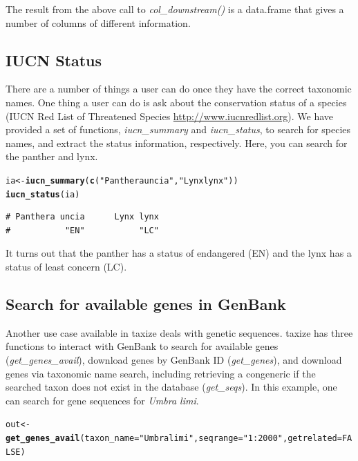 \documentclass[10pt,a4paper,twocolumn]{article}\usepackage[]{graphicx}\usepackage[]{color}
\makeatletter
\newcommand{\hlnum}[1]{\textcolor[rgb]{0.686,0.059,0.569}{#1}}%
\newcommand{\hlstr}[1]{\textcolor[rgb]{0.192,0.494,0.8}{#1}}%
\newcommand{\hlstd}[1]{\textcolor[rgb]{0.345,0.345,0.345}{#1}}%
\newcommand{\hlkwb}[1]{\textcolor[rgb]{0.69,0.353,0.396}{#1}}%
\newcommand{\hlkwc}[1]{\textcolor[rgb]{0.333,0.667,0.333}{#1}}%
\newcommand{\hlkwd}[1]{\textcolor[rgb]{0.737,0.353,0.396}{\textbf{#1}}}%
\newenvironment{kframe}{%
 \def\at@end@of@kframe{}%
 \ifinner\ifhmode%
  \def\at@end@of@kframe{\end{minipage}}%
  \begin{minipage}{\columnwidth}%
 \fi\fi%
 \def\FrameCommand##1{\hskip\@totalleftmargin \hskip-\fboxsep
 \colorbox{shadecolor}{##1}\hskip-\fboxsep
     \hskip-\linewidth \hskip-\@totalleftmargin \hskip\columnwidth}%
 \MakeFramed {\advance\hsize-\width
   \@totalleftmargin\z@ \linewidth\hsize
   \@setminipage}}%
 {\par\unskip\endMakeFramed%
 \at@end@of@kframe}
\newenvironment{knitrout}{}{} %
\makeatother
\begin{document}
The result from the above call to \emph{col\_downstream()} is a data.frame that gives a number of columns of different information.

\subsection*{IUCN Status}
There are a number of things a user can do once they have the correct taxonomic names. One thing a user can do is ask about the conservation status of a species (IUCN Red List of Threatened Species \url{http://www.iucnredlist.org}). We have provided a set of functions, \emph{iucn\_summary} and \emph{iucn\_status}, to search for species names, and extract the status information, respectively. Here, you can search for the panther and lynx.

\begin{knitrout}\scriptsize
{}\color{fgcolor}\begin{kframe}
\begin{alltt}
\hlstd{ia} \hlkwb{<-} \hlkwd{iucn_summary}\hlstd{(}\hlkwd{c}\hlstd{(}\hlstr{"Panthera uncia"}\hlstd{,} \hlstr{"Lynx lynx"}\hlstd{))}
\hlkwd{iucn_status}\hlstd{(ia)}
\end{alltt}
\begin{verbatim}
# Panthera uncia      Lynx lynx 
#           "EN"           "LC"
\end{verbatim}
\end{kframe}
\end{knitrout}



It turns out that the panther has a status of endangered (EN) and the lynx has a status of least concern (LC).

\subsection*{Search for available genes in GenBank}
Another use case available in taxize deals with genetic sequences. taxize has three functions to interact with GenBank to search for available genes (\emph{get\_genes\_avail}), download genes by GenBank ID (\emph{get\_genes}), and download genes via taxonomic name search, including retrieving a congeneric if the searched taxon does not exist in the database (\emph{get\_seqs}). In this example, one can search for gene sequences for \emph{Umbra limi}.

\begin{knitrout}\scriptsize
{}\color{fgcolor}\begin{kframe}
\begin{alltt}
\hlstd{out} \hlkwb{<-} \hlkwd{get_genes_avail}\hlstd{(}\hlkwc{taxon_name} \hlstd{=} \hlstr{"Umbra limi"}\hlstd{,} \hlkwc{seqrange} \hlstd{=} \hlstr{"1:2000"}\hlstd{,} \hlkwc{getrelated} \hlstd{=} \hlnum{FALSE}\hlstd{)}
\end{alltt}
\end{kframe}
\end{knitrout}
\end{document}
